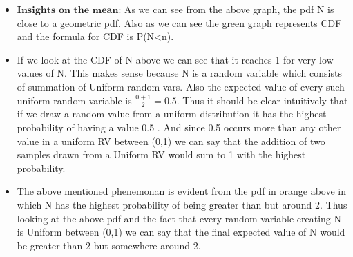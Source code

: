 \documentclass[11pt]{article}
\begin{document}
    \begin{itemize}
\item
  \(\textbf{Insights on the mean}\): As we can see from the above graph,
  the pdf N is close to a geometric pdf. Also as we can see the green
  graph represents CDF and the formula for CDF is P(N\textless{}n).
\item
  If we look at the CDF of N above we can see that it reaches 1 for very
  low values of N. This makes sense because N is a random variable which
  consists of summation of Uniform random vars. Also the expected value
  of every such uniform random variable is \(\frac{0+1}{2} = 0.5\). Thus
  it should be clear intuitively that if we draw a random value from a
  uniform distribution it has the highest probability of having a value
  0.5 . And since 0.5 occurs more than any other value in a uniform RV
  between (0,1) we can say that the addition of two samples drawn from a
  Uniform RV would sum to 1 with the highest probability.
\item
  The above mentioned phenemonan is evident from the pdf in orange above
  in which N has the highest probability of being greater than but
  around 2. Thus looking at the above pdf and the fact that every random
  variable creating N is Uniform between (0,1) we can say that the final
  expected value of N would be greater than 2 but somewhere around 2.
\end{itemize}
\end{document}
